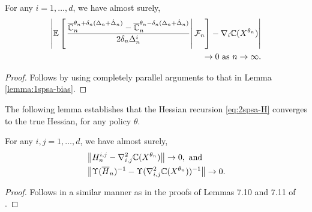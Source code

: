 \begin{lemma}
\label{lemma:2spsa-grad}
For any $i = 1,\ldots,d$, we have almost surely,  
\begin{align*}
\left| \mathbb{E}\left[\left.\dfrac{\overline {\mathbb{C}}_n^{\theta_n + \delta_n (\Delta_n + \hat \Delta_n)} -\overline {\mathbb{C}}_n^{\theta_n - \delta_n (\Delta_n + \hat \Delta_n)}}{2 \delta_n \Delta_n^i}\right| \mathcal{F}_n \right] - \nabla_i \mathbb{C}(X^{\theta_n}) \right|\\
 \rightarrow 0 \text{ as } n\rightarrow\infty.
\end{align*} 
\end{lemma}
\begin{proof}
Follows by using completely parallel arguments to that in Lemma \ref{lemma:1spsa-bias}.
\end{proof}

The following lemma establishes that the Hessian recursion \eqref{eq:2spsa-H} converges to the true Hessian, for any policy $\theta$.

\begin{lemma}
\label{lemma:h-est}
For any $i, j= 1,\ldots,d$, we have almost surely,  
\begin{align*}
&\left \| H^{i, j}_n - \nabla^2_{i,j} \mathbb{C}(X^{\theta_n}) \right \| \rightarrow 0,
\text{ and }\\
&\left \| \Upsilon(\overline H_n)^{-1} - \Upsilon(\nabla^2_{i,j} \mathbb{C}(X^{\theta_n}))^{-1} \right \| \rightarrow 0.
\end{align*}
\end{lemma}
\begin{proof}
 Follows in a similar manner as in the proofs of Lemmas 7.10 and 7.11 of \cite{Bhatnagar13SR}.
\end{proof}

